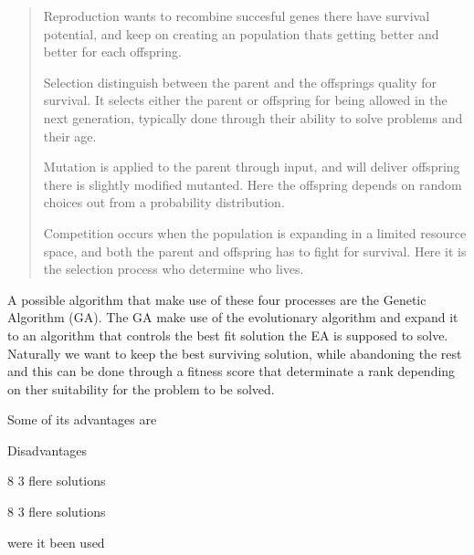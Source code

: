 \begin{quote}
Reproduction wants to recombine succesful genes there have survival potential, and keep on creating an population thats getting better and better for each offspring. \cite{Fogel 1997}

Selection distinguish between the parent and the offsprings quality for survival. It selects either the parent or offspring for being allowed in the next generation, typically done through their ability to solve problems and their age.   \cite{Smith 2007}



Mutation is applied to the parent through input, and will deliver offspring there is slightly modified mutanted. Here the offspring depends on random choices out from a probability distribution.  \cite{Smith 2007}


Competition occurs when the population is expanding in a limited resource space, and both the parent and offspring has to fight for survival. Here it is the selection process who determine who lives. \cite{Fogel 1997}

\end{quote}

A possible algorithm that make use of these four processes are the Genetic Algorithm (GA). The GA make use of the evolutionary algorithm and expand it to an algorithm that controls the best fit solution the EA is supposed to solve. Naturally we want to keep the best surviving solution, while abandoning the rest and this can be done through a fitness score that determinate a rank depending on ther suitability for the problem to be solved. \cite {Sivanandam 2008}

Some of its advantages are  

Disadvantages  

8
3 flere solutions 

8
3 flere solutions 



were it been used 




